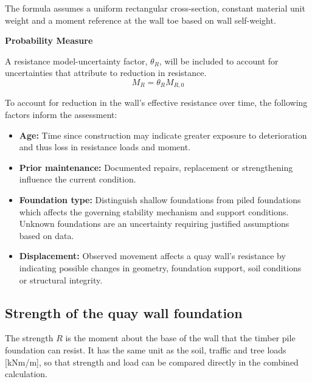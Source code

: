 The formula assumes a uniform rectangular cross-section, constant material unit weight and a moment reference at the wall toe based on wall self-weight.

\textbf{Probability Measure}

A resistance model-uncertainty factor, $\theta_R$, will be included to account for uncertainties that attribute to reduction in resistance.
\begin{equation}
M_R = \theta_R M_{R,0}
\end{equation}

To account for reduction in the wall's effective resistance over time, the following factors inform the assessment:

\begin{itemize}
    \item \textbf{Age:} Time since construction may indicate greater exposure to deterioration and thus loss in resistance loads and moment.

    \item \textbf{Prior maintenance:} Documented repairs, replacement or strengthening  influence the current condition.

    \item \textbf{Foundation type:} Distinguish shallow foundations from piled foundations which affects the governing stability mechanism and support conditions. Unknown foundations are an uncertainty requiring justified assumptions based on data.
    
    \item \textbf{Displacement:} Observed movement affects a quay wall's resistance by indicating possible changes in geometry, foundation support, soil conditions or structural integrity.
    
\end{itemize}


\subsection{Strength of the quay wall foundation}
\label{sec:strength}

The strength $R$ is the moment about the base of the wall that the timber
pile foundation can resist. It has the same unit as the soil, traffic and
tree loads [kNm/m], so that strength and load can be compared directly in
the combined calculation.

